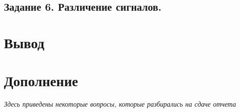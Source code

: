 

\subsection{Задание 6. Различение сигналов.}

\section{Вывод}


\newpage
\section{Дополнение}
\textit{Здесь приведены некоторые вопросы, которые разбирались на сдаче отчета}

